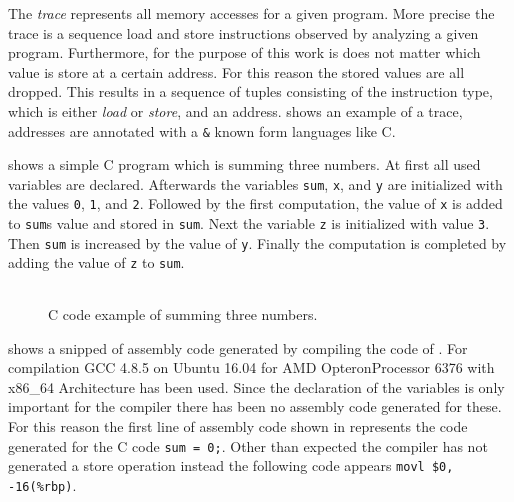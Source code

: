 \documentclass[onecolumn, openright, master, english, signatures]{dbrgrptt}
\begin{document}
The \emph{\ac{trace}} represents all memory accesses for a given program. More precise the \ac{trace} is a sequence load and store instructions observed by analyzing a given program. Furthermore, for the purpose of this work is does not matter which value is store at a certain address. For this reason the stored values are all dropped. This results in a sequence of tuples consisting of the instruction type, which is either \emph{load} or \emph{store}, and an address.  shows an example of a \ac{trace}, addresses are annotated with a \texttt{\&} known form languages like C.

 shows a simple C program which is summing three numbers. At first all used variables are declared. Afterwards the variables \texttt{sum}, \texttt{x}, and \texttt{y} are initialized with the values \texttt{0}, \texttt{1}, and \texttt{2}. Followed by the first computation, the value of \texttt{x} is added to \texttt{sum}s value and stored in \texttt{sum}. Next the variable \texttt{z} is initialized with value \texttt{3}. Then \texttt{sum} is increased by the value of \texttt{y}. Finally the computation is completed by adding the value of \texttt{z} to \texttt{sum}.

\begin{figure}[!ht]
  \centering
  \begin{tabular}{c}
  
  \end{tabular}
  \caption{C code example of summing three numbers.}
  \label{fig:mat-example-c-code}
\end{figure}

 shows a snipped of assembly code generated by compiling the code of . For compilation GCC 4.8.5 on Ubuntu 16.04 for AMD Opteron\texttrademark Processor 6376 with x86\_64 Architecture has been used. Since the declaration of the variables is only important for the compiler there has been no assembly code generated for these. For this reason the first line of assembly code shown in  represents the code generated for the C code \texttt{sum = 0;}. Other than expected the compiler has not generated a store operation instead the following code appears \texttt{movl \$0, -16(\%rbp)}.
\end{document}
